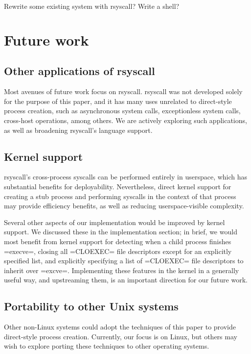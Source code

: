 \documentclass{acmart}
\begin{document}
Rewrite some existing system with rsyscall?
Write a shell?
\section{Future work}\label{future_work}
\subsection{Other applications of rsyscall}
Most avenues of future work focus on rsyscall.
rsyscall was not developed solely for the purpose of this paper,
and it has many uses unrelated to direct-style process creation,
such as asynchronous system calls, exceptionless system calls\cite{flexsc}, cross-host operations, among others.
We are actively exploring such applications,
as well as broadening rsyscall's language support.
\subsection{Kernel support}
rsyscall's cross-process syscalls can be performed entirely in userspace,
which has substantial benefits for deployability.
Nevertheless, direct kernel support for creating a stub process and performing syscalls in the context of that process
may provide efficiency benefits, as well as reducing userspace-visible complexity.

Several other aspects of our implementation would be improved by kernel support.
We discussed these in the implementation section;
in brief, we would most benefit from kernel support for
detecting when a child process finishes =execve=,
closing all =CLOEXEC= file descriptors except for an explicitly specified list,
and explicitly specifying a list of =CLOEXEC= file descriptors to inherit over =excve=.
Implementing these features in the kernel in a generally useful way, and upstreaming them,
is an important direction for our future work.
\subsection{Portability to other Unix systems}
Other non-Linux systems
could adopt the techniques of this paper
to provide direct-style process creation.
Currently, our focus is on Linux,
but others may wish to explore porting these techniques to other operating systems.
\end{document}
